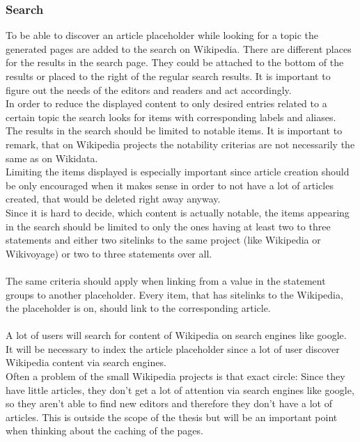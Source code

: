 \subsubsection{Search}
To be able to discover an article placeholder while looking for a topic the generated pages are added to the search on Wikipedia. There are different places for the results in the search page. They could be attached to the bottom of the results or placed to the right of the regular search results. It is important to figure out the needs of the editors and readers and act accordingly. \\
In order to reduce the displayed content to only desired entries related to a certain topic the search looks for items with corresponding labels and aliases.  \\
The results in the search should be limited to notable items. It is important to remark, that on Wikipedia projects the notability criterias are not necessarily the same as on Wikidata. \\
Limiting the items displayed is especially important since article creation should be only encouraged when it makes sense in order to not have a lot of articles created, that would be deleted right away anyway.\\
Since it is hard to decide, which content is actually notable, the items appearing in the search should be limited to only the ones having at least two to three statements and either two sitelinks to the same project (like Wikipedia or Wikivoyage) or two to three statements over all. \\
\\
The same criteria should apply when linking from a value in the statement groups to another placeholder. Every item, that has sitelinks to the Wikipedia, the placeholder is on, should link to the corresponding article.  \\
\\
A lot of users will search for content of Wikipedia on search engines like google. It will be necessary to index the article placeholder since a lot of user discover Wikipedia content via search engines.  \\
Often a problem of the small Wikipedia projects is that exact circle: Since they have little articles, they don't get a lot of attention via search engines like google, so they aren't able to find new editors and therefore they don't have a lot of articles. 
This is outside the scope of the thesis but will be an important point when thinking about the caching of the pages. 
